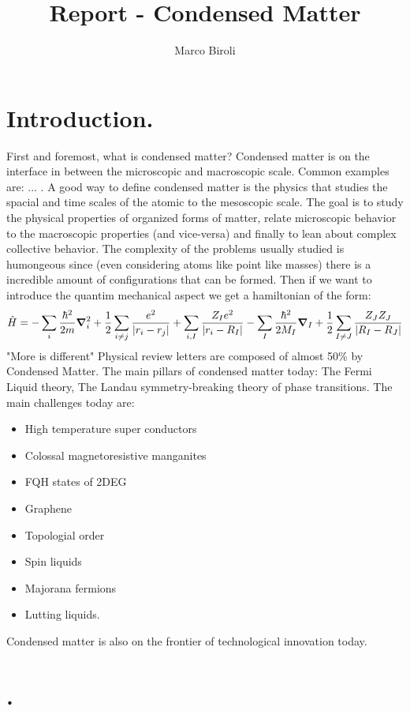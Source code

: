 \documentclass[10pt,a4paper]{article}
\author{Marco Biroli}
\title{Report - Condensed Matter}
\begin{document}
\maketitle
\section{Introduction.}
First and foremost, what is condensed matter? Condensed matter is on the interface in between the microscopic and macroscopic scale. Common examples are: ... . A good way to define condensed matter is the physics that studies the spacial and time scales of the atomic to the mesoscopic scale. The goal is to study the physical properties of organized forms of matter, relate microscopic behavior to the macroscopic properties (and vice-versa) and finally to lean about complex collective behavior. The complexity of the problems usually studied is humongeous since (even considering atoms like point like masses) there is a incredible amount of configurations that can be formed. Then if we want to introduce the quantim mechanical aspect we get a hamiltonian of the form:
\[
\hat{H} = -\sum_i \frac{\hbar^2}{2m} \grad_i^2 + \frac{1}{2}\sum_{i \neq j} \frac{e^2}{|r_i - r_j|} + \sum_{i, I} \frac{Z_I e^2}{|r_i - R_I|} - \sum_{I} \frac{\hbar^2}{2M_I} \grad_I + \frac{1}{2}\sum_{I \neq J} \frac{Z_J Z_J}{|R_I - R_J|}
\]
"More is different" 
Physical review letters are composed of almost 50\% by Condensed Matter. The main pillars of condensed matter today: The Fermi Liquid theory, The Landau symmetry-breaking theory of phase transitions. The main challenges today are:
\begin{itemize}
\item High temperature super conductors
\item Colossal magnetoresistive manganites
\item FQH states of 2DEG
\item Graphene
\item Topologial order
\item Spin liquids
\item Majorana fermions
\item Lutting liquids.
\end{itemize}
Condensed matter is also on the frontier of technological innovation today.

\section{.}
\end{document}
